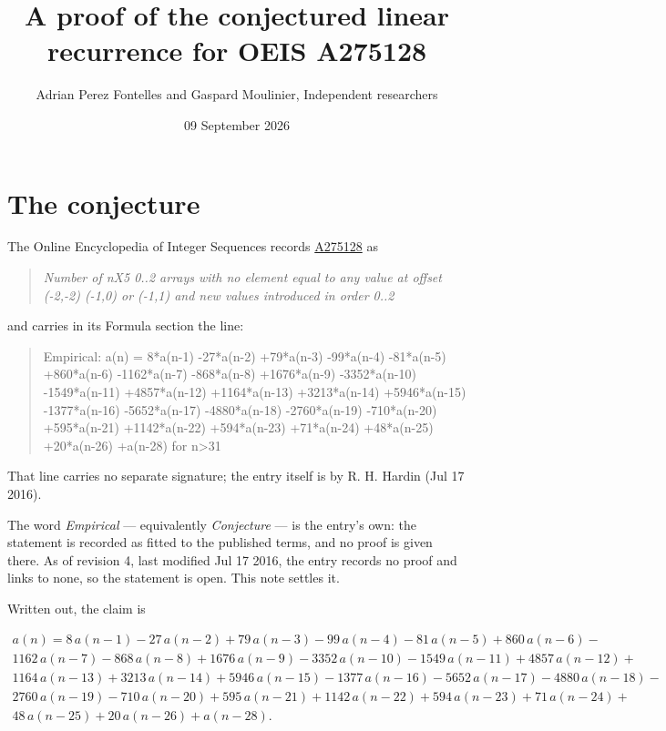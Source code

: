 \documentclass[11pt]{article}
\title{A proof of the conjectured linear recurrence for OEIS A275128}
\author{Adrian Perez Fontelles and Gaspard Moulinier, Independent researchers}
\date{09 September 2026}
\theoremstyle{definition}
\begin{document}
\maketitle
\section{The conjecture}

The Online Encyclopedia of Integer Sequences records \href{https://oeis.org/A275128}{A275128} as

\begin{quote}\itshape Number of nX5 0..2 arrays with no element equal to any value at offset (-2,-2) (-1,0) or (-1,1) and new values introduced in order 0..2\end{quote}

and carries in its Formula section the line:

\begin{quote}\ttfamily Empirical: a(n) = 8*a(n-1) -27*a(n-2) +79*a(n-3) -99*a(n-4) -81*a(n-5) +860*a(n-6) -1162*a(n-7) -868*a(n-8) +1676*a(n-9) -3352*a(n-10) -1549*a(n-11) +4857*a(n-12) +1164*a(n-13) +3213*a(n-14) +5946*a(n-15) -1377*a(n-16) -5652*a(n-17) -4880*a(n-18) -2760*a(n-19) -710*a(n-20) +595*a(n-21) +1142*a(n-22) +594*a(n-23) +71*a(n-24) +48*a(n-25) +20*a(n-26) +a(n-28) for n>31\end{quote}

That line carries no separate signature; the entry itself is by R. H. Hardin (Jul 17 2016).

The word {\itshape Empirical} --- equivalently {\itshape Conjecture} --- is the entry's own: the statement is recorded as fitted to the published terms, and no proof is given there. As of revision 4, last modified Jul 17 2016, the entry records no proof and links to none, so the statement is open. This note settles it.

Written out, the claim is

\begin{multline*} a(n) = 8\,a(n-1) - 27\,a(n-2) + 79\,a(n-3) - 99\,a(n-4) - 81\,a(n-5) + 860\,a(n-6) - \\ 1162\,a(n-7) - 868\,a(n-8) + 1676\,a(n-9) - 3352\,a(n-10) - 1549\,a(n-11) + 4857\,a(n-12) + \\ 1164\,a(n-13) + 3213\,a(n-14) + 5946\,a(n-15) - 1377\,a(n-16) - 5652\,a(n-17) - 4880\,a(n-18) - \\ 2760\,a(n-19) - 710\,a(n-20) + 595\,a(n-21) + 1142\,a(n-22) + 594\,a(n-23) + 71\,a(n-24) + \\ 48\,a(n-25) + 20\,a(n-26) + a(n-28). \end{multline*}
\end{document}
